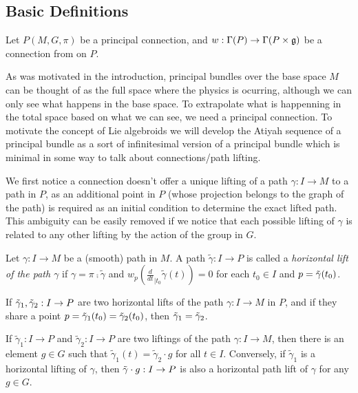 \subsection{Basic Definitions}

Let $P(M, G, \pi)$ be a principal connection, and $w : \Gamma(P) \to \Gamma(P \times \mathfrak{g})$ be a connection from on $P$.

As was motivated in the introduction, principal bundles over the base space $M$ can be thought of as the full space where the physics is ocurring, although we can only see what happens in the base space. To extrapolate what is happenning in the total space based on what we can see, we need a principal connection. To motivate the concept of Lie algebroids we will develop the Atiyah sequence of a principal bundle as a sort of infinitesimal version of a principal bundle which is minimal in some way to talk about connections/path lifting.

We first notice a connection doesn't offer a unique lifting of a path $\gamma:I \to M$ to a path in $P$, as an additional point in $P$ (whose projection belongs to the graph of the path) is required as an initial condition to determine the exact lifted path. This ambiguity can be easily removed if we notice that each possible lifting of $\gamma$ is related to any other lifting by the action of the group in $G$.

\begin{definition} 
Let $\gamma: I \to M$ be a (smooth) path in $M$. A path $\tilde{\gamma}: I \to P$ is called a \emph{horizontal lift of the path $\gamma$} if $\gamma = \pi \comp \tilde{\gamma}$ and $w_p(\frac{d}{dt}_{|t_0} \tilde{\gamma}(t)) = 0$ for each $t_0 \in I$ and $p = \Tilde{\gamma}(t_0)$.
\end{definition}

\begin{proposition} 
If $\Tilde{\gamma}_1, \Tilde{\gamma}_2:I \to P$ are two horizontal lifts of the path $\gamma:I \to M$ in $P$, and if they share a point $p = \Tilde{\gamma}_1(t_0) = \Tilde{\gamma}_2(t_0)$, then $\Tilde{\gamma}_1 = \Tilde{\gamma}_2$. 
\end{proposition}

\begin{theorem}\label{thm:pathRed}
If $\tilde{\gamma}_1: I \to P$ and $\tilde{\gamma}_2: I \to P$ are two liftings of the path $\gamma:I \to M$, then there is an element $g \in G$ such that $\tilde{\gamma}_1 (t) = \tilde{\gamma}_2 \cdot g$ for all $t \in I$. Conversely, if $\tilde{\gamma}_1$ is a horizontal lifting of $\gamma$, then $\Tilde{\gamma}\cdot g :I \to P$ is also a horizontal path lift of $\gamma$ for any $g\in G$.
\end{theorem}

